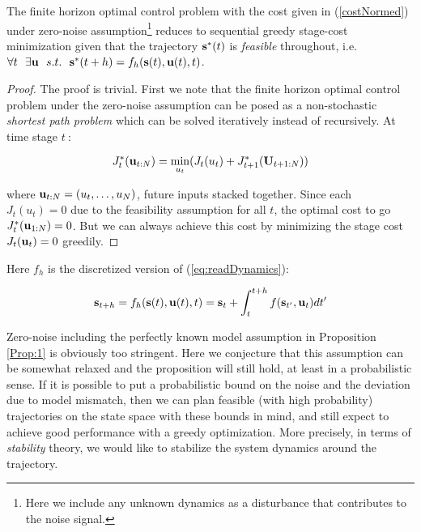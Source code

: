 \begin{proposition}
The finite horizon optimal control problem with the cost given in (\ref{costNormed}) under zero-noise assumption\footnote{Here we include any unknown dynamics as a disturbance that contributes to the noise signal.} reduces to sequential greedy stage-cost minimization given that the trajectory $\mathbf{s}^{*}(t)$ is \emph{feasible} throughout, i.e. $\forall t \ \ \exists \mathbf{u} \ \ s.t. \ \ \mathbf{s}^{*}(t+h) = f_{h}(\mathbf{s}(t), \mathbf{u}(t), t)$.
\label{Prop:1}
\end{proposition}

\begin{proof}
The proof is trivial. First we note that the finite horizon optimal control problem under the zero-noise assumption can be posed as a non-stochastic \emph{shortest path problem} which can be solved iteratively instead of recursively. At time stage $t \ $:

\begin{equation*}
J^{*}_{t}(\mathbf{u}_{t:N}) = \min_{u_{t}}(J_{t}(u_{t}) + J^{*}_{t+1}(\mathbf{U}_{t+1:N}))
\end{equation*}

where $\mathbf{u}_{t:N} = (u_{t}, \ldots, u_{N})$, future inputs stacked together. Since each $J_{t}(u_{t}) = 0$ due to the feasibility assumption for all $t$, the optimal cost to go $J^{*}_{t}(\mathbf{u}_{1:N}) = 0$. But we can always achieve this cost by minimizing the stage cost $J_{t}(\mathbf{u}_{t}) = 0$ greedily.

\end{proof}

Here $f_{h}$ is the discretized version of (\ref{eq:readDynamics}):

\begin{equation}
\mathbf{s}_{t+h} = f_{h}(\mathbf{s}(t), \mathbf{u}(t), t) = \mathbf{s}_{t} + \int_{t}^{t+h}f(\mathbf{s}_{t'},\mathbf{u}_t)dt' \label{eq:realDynamics_discrete}
\end{equation}

Zero-noise including the perfectly known model assumption in Proposition \ref{Prop:1} is obviously too stringent. Here we conjecture that this assumption can be somewhat relaxed and the proposition will still hold, at least in a probabilistic sense. If it is possible to put a probabilistic bound on the noise and the deviation due to model mismatch, then we can plan feasible (with high probability) trajectories on the state space with these bounds in mind, and still expect to achieve good performance with a greedy optimization. More precisely, in terms of \emph{stability} theory, we would like to stabilize the system dynamics around the trajectory.

